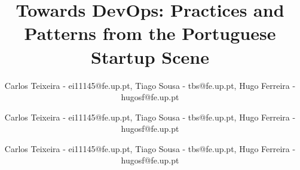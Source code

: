 \documentclass{llncs}
\begin{document}


\title{Towards DevOps: Practices and Patterns from the Portuguese Startup Scene}

\author{Carlos Teixeira - ei11145@fe.up.pt, Tiago Sousa - tbs@fe.up.pt, Hugo Ferreira - hugosf@fe.up.pt}
\author{Carlos Teixeira - ei11145@fe.up.pt, Tiago Sousa - tbs@fe.up.pt, Hugo Ferreira - hugosf@fe.up.pt}
\author{Carlos Teixeira - ei11145@fe.up.pt, Tiago Sousa - tbs@fe.up.pt, Hugo Ferreira - hugosf@fe.up.pt}

%
\end{document}
